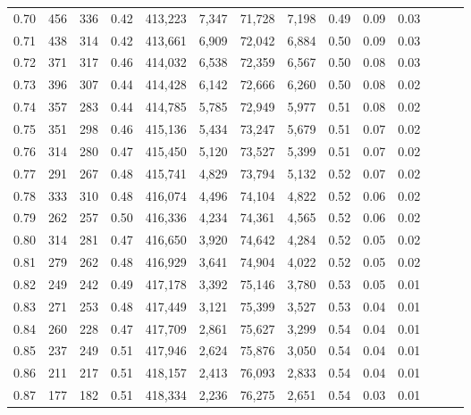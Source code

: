 \begin{tabular}{rrrrrrrrrrrrrr}
0.70 &     456 &    336 &  0.42 &  413,223 &    7,347 &  71,728 &   7,198 &  0.49 &  0.09 &      0.03 \\
0.71 &     438 &    314 &  0.42 &  413,661 &    6,909 &  72,042 &   6,884 &  0.50 &  0.09 &      0.03 \\
0.72 &     371 &    317 &  0.46 &  414,032 &    6,538 &  72,359 &   6,567 &  0.50 &  0.08 &      0.03 \\
0.73 &     396 &    307 &  0.44 &  414,428 &    6,142 &  72,666 &   6,260 &  0.50 &  0.08 &      0.02 \\
0.74 &     357 &    283 &  0.44 &  414,785 &    5,785 &  72,949 &   5,977 &  0.51 &  0.08 &      0.02 \\
0.75 &     351 &    298 &  0.46 &  415,136 &    5,434 &  73,247 &   5,679 &  0.51 &  0.07 &      0.02 \\
0.76 &     314 &    280 &  0.47 &  415,450 &    5,120 &  73,527 &   5,399 &  0.51 &  0.07 &      0.02 \\
0.77 &     291 &    267 &  0.48 &  415,741 &    4,829 &  73,794 &   5,132 &  0.52 &  0.07 &      0.02 \\
0.78 &     333 &    310 &  0.48 &  416,074 &    4,496 &  74,104 &   4,822 &  0.52 &  0.06 &      0.02 \\
0.79 &     262 &    257 &  0.50 &  416,336 &    4,234 &  74,361 &   4,565 &  0.52 &  0.06 &      0.02 \\
0.80 &     314 &    281 &  0.47 &  416,650 &    3,920 &  74,642 &   4,284 &  0.52 &  0.05 &      0.02 \\
0.81 &     279 &    262 &  0.48 &  416,929 &    3,641 &  74,904 &   4,022 &  0.52 &  0.05 &      0.02 \\
0.82 &     249 &    242 &  0.49 &  417,178 &    3,392 &  75,146 &   3,780 &  0.53 &  0.05 &      0.01 \\
0.83 &     271 &    253 &  0.48 &  417,449 &    3,121 &  75,399 &   3,527 &  0.53 &  0.04 &      0.01 \\
0.84 &     260 &    228 &  0.47 &  417,709 &    2,861 &  75,627 &   3,299 &  0.54 &  0.04 &      0.01 \\
0.85 &     237 &    249 &  0.51 &  417,946 &    2,624 &  75,876 &   3,050 &  0.54 &  0.04 &      0.01 \\
0.86 &     211 &    217 &  0.51 &  418,157 &    2,413 &  76,093 &   2,833 &  0.54 &  0.04 &      0.01 \\
0.87 &     177 &    182 &  0.51 &  418,334 &    2,236 &  76,275 &   2,651 &  0.54 &  0.03 &      0.01 \\

\end{tabular}
